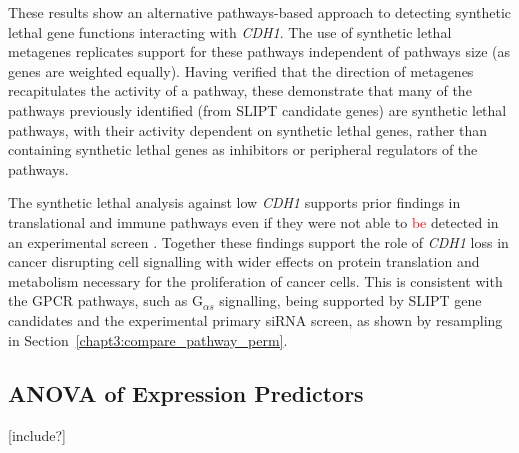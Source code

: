 These results show an alternative \glspl{pathway}-based approach to detecting \gls{synthetic lethal} gene functions interacting with \textit{CDH1}. The use of \gls{synthetic lethal} \glspl{metagene} replicates support for these \glspl{pathway} independent of \glspl{pathway} size (as genes are weighted equally). Having verified that the direction of \glspl{metagene} recapitulates the activity of a \gls{pathway}, these demonstrate that many of the \glspl{pathway} previously identified (from \gls{SLIPT} candidate genes) are \gls{synthetic lethal} \glspl{pathway}, with their activity dependent on \gls{synthetic lethal} genes, rather than containing \gls{synthetic lethal} genes as inhibitors or peripheral regulators of the \glspl{pathway}.


The \gls{synthetic lethal} analysis against low \textit{CDH1}  supports prior findings in translational and immune \glspl{pathway} even if they were not able to \textcolor{red}{be} detected in an experimental screen \citep{Telford2015}. Together these findings support the role of \textit{CDH1} loss in cancer disrupting cell signalling with wider effects on protein translation and metabolism necessary for the proliferation of cancer cells. This is consistent with the \gls{GPCR} \glspl{pathway}, such as G$_{\alpha s}$ signalling, being supported by \gls{SLIPT} gene candidates and the experimental primary \gls{siRNA} screen, as shown by resampling in Section~\ref{chapt3:compare_pathway_perm}.


\FloatBarrier



\iffalse
\subsection{ANOVA of Expression Predictors}
[include?]

